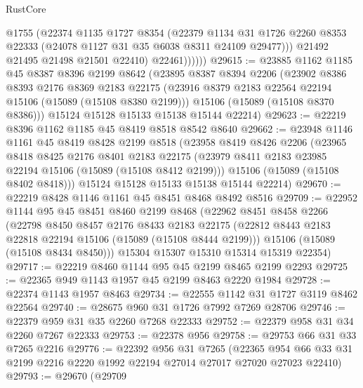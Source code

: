 \begin{lexlean}{RustCore}
\begin{coremodule}
                  @1755
                  (@22374
                    @1135
                    @1727
                    @8354
                    (@22379
                      @1134
                      @31
                      @1726
                      @2260
                      @8353
                      @22333
                      (@24078 @1127 @31 @35 @6038 @8311 @24109 @29477)))
                  @21492
                  @21495
                  @21498
                  @21501
                  @22410)
                @22461))))))
@29615 := @23885
    @1162
    @1185
    @45
    @8387
    @8396
    @2199
    @8642
    (@23895
      @8387
      @8394
      @2206
      (@23902
        @8386
        @8393
        @2176
        @8369
        @2183
        @22175
        (@23916 @8379 @2183 @22564 @22194 @15106 (@15089 (@15108 @8380 @2199)))
        @15106
        (@15089 (@15108 @8370 @8386)))
      @15124
      @15128
      @15133
      @15138
      @15144
      @22214)
@29623 := @22219 @8396 @1162 @1185 @45 @8419 @8518 @8542 @8640
@29662 := @23948
    @1146
    @1161
    @45
    @8419
    @8428
    @2199
    @8518
    (@23958
      @8419
      @8426
      @2206
      (@23965
        @8418
        @8425
        @2176
        @8401
        @2183
        @22175
        (@23979 @8411 @2183 @23985 @22194 @15106 (@15089 (@15108 @8412 @2199)))
        @15106
        (@15089 (@15108 @8402 @8418)))
      @15124
      @15128
      @15133
      @15138
      @15144
      @22214)
@29670 := @22219 @8428 @1146 @1161 @45 @8451 @8468 @8492 @8516
@29709 := @22952
    @1144
    @95
    @45
    @8451
    @8460
    @2199
    @8468
    (@22962
      @8451
      @8458
      @2266
      (@22798
        @8450
        @8457
        @2176
        @8433
        @2183
        @22175
        (@22812 @8443 @2183 @22818 @22194 @15106 (@15089 (@15108 @8444 @2199)))
        @15106
        (@15089 (@15108 @8434 @8450)))
      @15304
      @15307
      @15310
      @15314
      @15319
      @22354)
@29717 := @22219 @8460 @1144 @95 @45 @2199 @8465 @2199 @2293
@29725 := @22365 @949 @1143 @1957 @45 @2199 @8463 @2220 @1984
@29728 := @22374 @1143 @1957 @8463
@29734 := @22555 @1142 @31 @1727 @3119 @8462 @22564
@29740 := @28675 @960 @31 @1726 @7992 @7269 @28706
@29746 := @22379 @959 @31 @35 @2260 @7268 @22333
@29752 := @22379 @958 @31 @34 @2260 @7267 @22333
@29753 := @22378 @956
@29758 := @29753 @66 @31 @33 @7265 @2216
@29776 := @22392
    @956
    @31
    @7265
    (@22365 @954 @66 @33 @31 @2199 @2216 @2220 @1992 @22194 @27014 @27017 @27020 @27023 @22410)
@29793 := @29670
    (@29709

\end{coremodule}
\end{lexlean}
